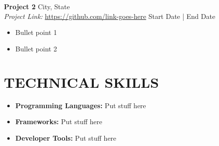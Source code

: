 \documentclass[a4paper,9pt]{extarticle}
\begin{document}
\noindent
\newline
\textbf{Project 2} \hfill City, State \\
\textit{Project Link:} \url{https://github.com/link-goes-here} \hfill Start Date | End Date
\begin{itemize}
    \item Bullet point 1
    \item Bullet point 2
\end{itemize}

\section*{TECHNICAL SKILLS}
\begin{itemize}
    \item \textbf{Programming Languages:} Put stuff here
    \item \textbf{Frameworks:} Put stuff here
    \item \textbf{Developer Tools:} Put stuff here
\end{itemize}

\end{document}
